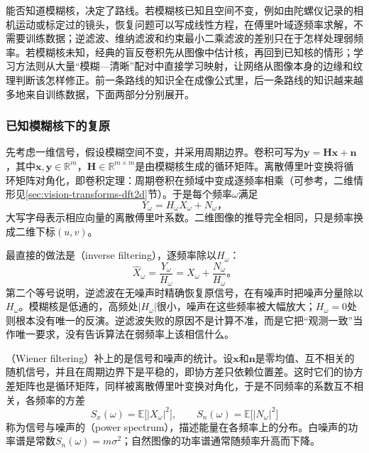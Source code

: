 能否知道模糊核，决定了路线。若模糊核已知且空间不变，例如由陀螺仪记录的相机运动或标定过的镜头，恢复问题可以写成线性方程，在傅里叶域逐频率求解，不需要训练数据；逆滤波、维纳滤波和约束最小二乘滤波的差别只在于怎样处理弱频率。若模糊核未知，经典的盲反卷积先从图像中估计核，再回到已知核的情形；学习方法则从大量“模糊—清晰”配对中直接学习映射，让网络从图像本身的边缘和纹理判断该怎样修正。前一条路线的知识全在成像公式里，后一条路线的知识越来越多地来自训练数据，下面两部分分别展开。

\subsubsection{已知模糊核下的复原}
\label{sec:vision-restoration-deconvolution}

先考虑一维信号，假设模糊空间不变，并采用周期边界。卷积可写为$\bm{y}=\bm{H}\bm{x}+\bm{n}$，其中$\bm{x},\bm{y}\in\mathbb{R}^{m}$，$\bm{H}\in\mathbb{R}^{m\times m}$是由模糊核生成的循环矩阵。离散傅里叶变换将循环矩阵对角化，即卷积定理：周期卷积在频域中变成逐频率相乘（可参考，二维情形见\ref{sec:vision-transforms-dft2d}节）。于是每个频率$\omega$满足
\begin{equation}
 Y_\omega=H_\omega X_\omega+N_\omega\text{，}
 \label{eq:vision-blur-frequency}
\end{equation}
大写字母表示相应向量的离散傅里叶系数。二维图像的推导完全相同，只是频率换成二维下标$(u,v)$。

最直接的做法是（inverse filtering），逐频率除以$H_\omega$：
\[
 \widehat X_\omega=\frac{Y_\omega}{H_\omega}=X_\omega+\frac{N_\omega}{H_\omega}\text{。}
\]
第二个等号说明，逆滤波在无噪声时精确恢复原信号，在有噪声时把噪声分量除以$H_\omega$。模糊核是低通的，高频处$|H_\omega|$很小，噪声在这些频率被大幅放大；$H_\omega=0$处则根本没有唯一的反演。逆滤波失败的原因不是计算不准，而是它把“观测一致”当作唯一要求，没有告诉算法在弱频率上该相信什么。

（Wiener filtering）补上的是信号和噪声的统计。设$\bm{x}$和$\bm{n}$是零均值、互不相关的随机信号，并且在周期边界下是平稳的，即协方差只依赖位置差。这时它们的协方差矩阵也是循环矩阵，同样被离散傅里叶变换对角化，于是不同频率的系数互不相关，各频率的方差
\[
 S_x(\omega)=\mathbb{E}\bigl[|X_\omega|^2\bigr],\qquad
 S_n(\omega)=\mathbb{E}\bigl[|N_\omega|^2\bigr]
\]
称为信号与噪声的（power spectrum），描述能量在各频率上的分布。白噪声的功率谱是常数$S_n(\omega)=m\sigma^2$；自然图像的功率谱通常随频率升高而下降。

